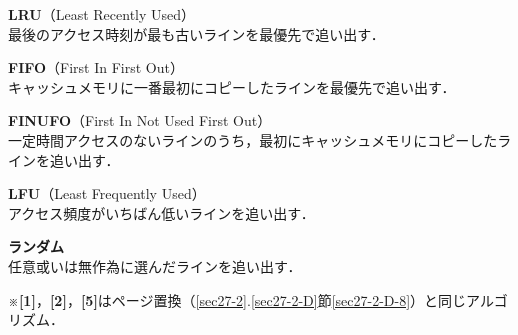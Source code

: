 \begin{enumerate}[label=\textbf{[\arabic*]}, labelsep=10pt, leftmargin=23pt]
	\item \textbf{LRU}（Least Recently Used）\\
		最後のアクセス時刻が最も古いラインを最優先で追い出す．
	\item \textbf{FIFO}（First In First Out）\\
		キャッシュメモリに一番最初にコピーしたラインを最優先で追い出す．
	\item \textbf{FINUFO}（First In Not Used First Out）\\
		一定時間アクセスのないラインのうち，最初にキャッシュメモリにコピーしたラインを追い出す．
	\item \textbf{LFU}（Least Frequently Used）\\
		アクセス頻度がいちばん低いラインを追い出す．
	\item \textbf{ランダム}\\
		任意或いは無作為に選んだラインを追い出す．
\end{enumerate}
※\textbf{[1]}，\textbf{[2]}，\textbf{[5]}はページ置換（\ref{sec27-2}.\ref{sec27-2-D}節\ref{sec27-2-D-8}）と同じアルゴリズム．